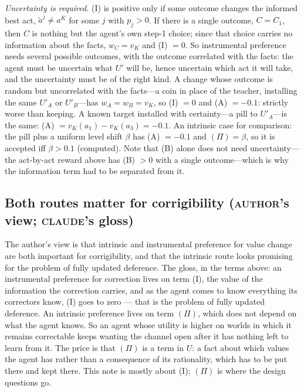 \documentclass[11pt,a4paper]{article}
\newcommand{\AUTHOR}{\textnormal{\scshape author}}
\newcommand{\CLAUDE}{\textnormal{\scshape claude}}
\begin{document}
\emph{Uncertainty is required.} (I) is positive only if some outcome changes the informed best act, $\tilde a^j \ne a^K$ for some $j$ with $p_j > 0$. If there is a single outcome, $C = C_1$, then $C$ is nothing but the agent's own step-1 choice; since that choice carries no information about the facts, $w_C = v_K$ and (I) $= 0$. So instrumental preference needs several possible outcomes, with the outcome correlated with the facts: the agent must be uncertain what $U'$ will be, hence uncertain which act it will take, and the uncertainty must be of the right kind. A change whose outcome is random but uncorrelated with the facts---a coin in place of the teacher, installing the same $U'_A$ or $U'_B$---has $w_A = w_B = v_K$, so (I) $= 0$ and (A) $= -0.1$: strictly worse than keeping. A known target installed with certainty---a pill to $U'_A$---is the same: (A) $= v_K(a_1) - v_K(a_3) = -0.1$. An intrinsic case for comparison: the pill plus a uniform level shift $\beta$ has (A) $= -0.1$ and $(\Pi) = \beta$, so it is accepted iff $\beta > 0.1$ (computed). Note that (B) alone does not need uncertainty---the act-by-act reward above has (B) $> 0$ with a single outcome---which is why the information term had to be separated from it.

\subsection{Both routes matter for corrigibility (\AUTHOR's view; \CLAUDE's gloss)}
The author's view is that intrinsic and instrumental preference for value change are both important for corrigibility, and that the intrinsic route looks promising for the problem of fully updated deference. The gloss, in the terms above: an instrumental preference for correction lives on term (I), the value of the information the correction carries, and as the agent comes to know everything its correctors know, (I) goes to zero --- that is the problem of fully updated deference. An intrinsic preference lives on term $(\Pi)$, which does not depend on what the agent knows. So an agent whose utility is higher on worlds in which it remains correctable keeps wanting the channel open after it has nothing left to learn from it. The price is that $(\Pi)$ is a term in $U$: a fact about which values the agent has rather than a consequence of its rationality, which has to be put there and kept there. This note is mostly about (I); $(\Pi)$ is where the design questions go.
\end{document}
